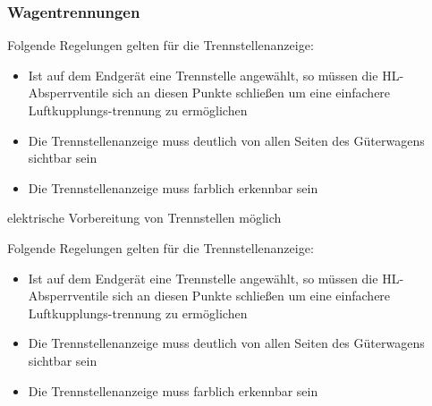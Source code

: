 \subsubsection{Wagentrennungen}
Folgende Regelungen gelten für die Trennstellenanzeige:
\begin{itemize}
    \item Ist auf dem Endgerät eine Trennstelle angewählt, so müssen die HL-Absperrventile sich an diesen Punkte schließen um eine einfachere Luftkupplungs-trennung zu ermöglichen
    \item Die Trennstellenanzeige muss deutlich von allen Seiten des Güterwagens sichtbar sein
    \item Die Trennstellenanzeige muss farblich erkennbar sein
\end{itemize}
\begin{feat}
elektrische Vorbereitung von Trennstellen möglich
\end{feat}
\begin{rem}
Folgende Regelungen gelten für die Trennstellenanzeige:
\begin{itemize}
    \item Ist auf dem Endgerät eine Trennstelle angewählt, so müssen die HL-Absperrventile sich an diesen Punkte schließen um eine einfachere Luftkupplungs-trennung zu ermöglichen
    \item Die Trennstellenanzeige muss deutlich von allen Seiten des Güterwagens sichtbar sein
    \item Die Trennstellenanzeige muss farblich erkennbar sein
\end{itemize}
\end{rem}

